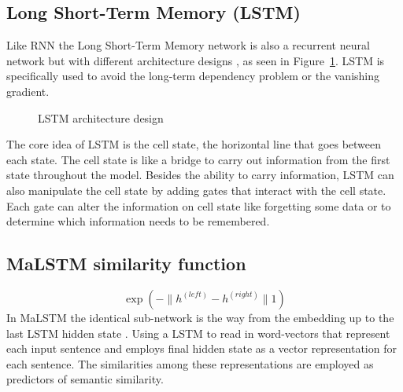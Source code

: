 \documentclass[12pt,oneside,openright,a4paper]{cpe-english-project}
\begin{document}
\subsection{Long Short-Term Memory (LSTM)}
Like RNN the Long Short-Term Memory network is also a recurrent neural network but with
different architecture designs \cite{understand_rnn}, as seen in Figure~\ref*{fig:lstm_arch_design}.
LSTM is specifically used to avoid the long-term dependency problem or the vanishing gradient.

\begin{figure}[!h] \centering
  \setlength{\fboxrule}{0.2mm}
  \setlength{\fboxsep}{0.5cm}
  \caption{LSTM architecture design}
  \label{fig:lstm_arch_design}
\end{figure}

The core idea of LSTM is the cell state, the horizontal line that goes between each state. The
cell state is like a bridge to carry out information from the first state throughout the model.
Besides the ability to carry information, LSTM can also manipulate the cell state by adding gates
that interact with the cell state. Each gate can alter the information on cell state like
forgetting some data or to determine which information needs to be remembered. 

\subsection{MaLSTM similarity function}
\[\exp(-\|h^{(left)} - h^{(right)}\|1)\]
In MaLSTM the identical sub-network is the way from the embedding up to the last LSTM hidden
state \cite{manhattan_lstm, what_is_embedding_matrix}. Using a LSTM to read in word-vectors that represent each
input sentence and employs final hidden state as a vector representation for each sentence.
The similarities among these representations are employed as predictors of semantic similarity.
\end{document}
